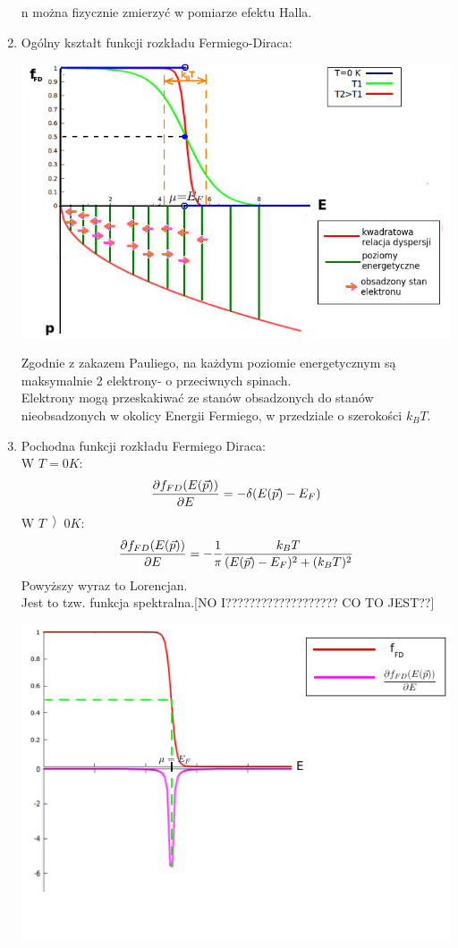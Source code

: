 \begin{enumerate}
n można fizycznie zmierzyć w pomiarze efektu Halla.
\item Ogólny kształt funkcji rozkładu Fermiego-Diraca:
\begin{center}\includegraphics[scale=0.75]{obrazki/wykl_7_obrazek4.png}\end{center}
Zgodnie z zakazem Pauliego, na każdym poziomie energetycznym są maksymalnie 2 elektrony- o przeciwnych spinach.\\
Elektrony mogą przeskakiwać ze stanów obsadzonych do stanów nieobsadzonych w  okolicy Energii Fermiego, w przedziale o szerokości $k_BT$.
\item Pochodna funkcji rozkładu Fermiego Diraca:\\
W $T=0 K$:
\begin{equation}\frac{\partial f_{FD}(E(\vec{p}))}{\partial E}=-\delta(E(\vec{p})-E_F)\end{equation}
W $T\left>0 K$:
\begin{equation}\frac{\partial f_{FD}(E(\vec{p}))}{\partial E}=-\frac{1}{\pi}\frac{k_BT}{(E(\vec{p})-E_F)^2+(k_BT)^2}\end{equation}
Powyższy wyraz to Lorencjan. \\
Jest to tzw. funkcja spektralna.[NO I??????????????????? CO TO JEST??]
\begin{center}\includegraphics[scale=0.5]{obrazki/wykl_7_obrazek5.png}\end{center}
\end{enumerate}
